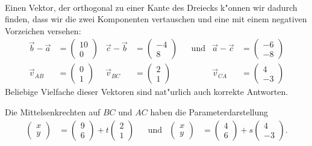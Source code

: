 \begin{loesung}
\begin{teilaufgaben}
\[\begin{aligned}
\end{aligned}
\]
%
%
\item Einen Vektor, der orthogonal zu einer Kante des Dreiecks k"onnen
wir dadurch finden, dass wir die zwei Komponenten vertauschen und eine
mit einem negativen Vorzeichen versehen:
\[
\begin{aligned}
\vec{b}-\vec{a}&=\begin{pmatrix}10\\ 0\end{pmatrix}&
\vec{c}-\vec{b}&=\begin{pmatrix}-4\\ 8\end{pmatrix}&
&\text{und}&
\vec{a}-\vec{c}&=\begin{pmatrix}-6\\-8\end{pmatrix}
\\
   \vec{v}_{AB}&=\begin{pmatrix} 0\\ 1\end{pmatrix}&
   \vec{v}_{BC}&=\begin{pmatrix} 2\\ 1\end{pmatrix}&
&&
   \vec{v}_{CA}&=\begin{pmatrix} 4\\-3\end{pmatrix}
\end{aligned}
\]
Beliebige Vielfache dieser Vektoren sind nat"urlich auch korrekte 
Antworten.
%
%
\item
Die Mittelsenkrechten auf $BC$ und $AC$ haben die Parameterdarstellung
\[
\begin{aligned}
\begin{pmatrix}x\\y\end{pmatrix}
&=
\begin{pmatrix}9\\6\end{pmatrix}+t\begin{pmatrix}2\\ 1\end{pmatrix}
&&\text{und}&
\begin{pmatrix}x\\y\end{pmatrix}
&=
\begin{pmatrix}4\\6\end{pmatrix}+s\begin{pmatrix}4\\-3\end{pmatrix}.

\end{aligned}\]
\end{teilaufgaben}
\end{loesung}
